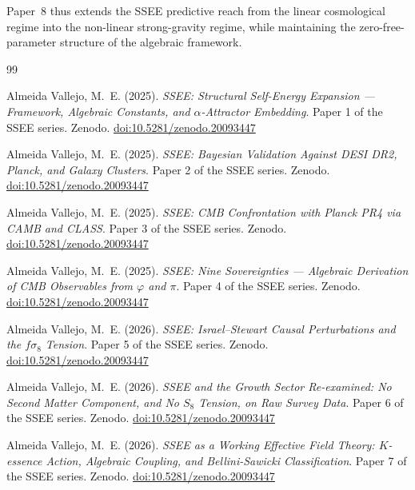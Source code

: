 \documentclass[12pt,a4paper]{article}
\begin{document}
Paper~8 thus extends the SSEE predictive reach from the linear cosmological
regime into the non-linear strong-gravity regime, while maintaining the
zero-free-parameter structure of the algebraic framework.

\clearpage
\begin{thebibliography}{99}

  Almeida Vallejo, M.~E. (2025).
  \textit{SSEE: Structural Self-Energy Expansion --- Framework,
  Algebraic Constants, and $\alpha$-Attractor Embedding}.
  Paper 1 of the SSEE series. Zenodo. \href{https://doi.org/10.5281/zenodo.20093447}{doi:10.5281/zenodo.20093447}

  Almeida Vallejo, M.~E. (2025).
  \textit{SSEE: Bayesian Validation Against DESI DR2, Planck, and
  Galaxy Clusters}.
  Paper 2 of the SSEE series. Zenodo. \href{https://doi.org/10.5281/zenodo.20093447}{doi:10.5281/zenodo.20093447}

  Almeida Vallejo, M.~E. (2025).
  \textit{SSEE: CMB Confrontation with Planck PR4 via CAMB and CLASS}.
  Paper 3 of the SSEE series. Zenodo. \href{https://doi.org/10.5281/zenodo.20093447}{doi:10.5281/zenodo.20093447}

  Almeida Vallejo, M.~E. (2025).
  \textit{SSEE: Nine Sovereignties --- Algebraic Derivation of CMB
  Observables from $\varphi$ and $\pi$}.
  Paper 4 of the SSEE series. Zenodo. \href{https://doi.org/10.5281/zenodo.20093447}{doi:10.5281/zenodo.20093447}

  Almeida Vallejo, M.~E. (2026).
  \textit{SSEE: Israel--Stewart Causal Perturbations and the
  $f\sigma_8$ Tension}.
  Paper 5 of the SSEE series. Zenodo. \href{https://doi.org/10.5281/zenodo.20093447}{doi:10.5281/zenodo.20093447}

  Almeida Vallejo, M.~E. (2026).
  \textit{SSEE and the Growth Sector Re-examined: No Second Matter
  Component, and No $S_8$ Tension, on Raw Survey Data}.
  Paper 6 of the SSEE series. Zenodo. \href{https://doi.org/10.5281/zenodo.20093447}{doi:10.5281/zenodo.20093447}

  Almeida Vallejo, M.~E. (2026).
  \textit{SSEE as a Working Effective Field Theory: $K$-essence Action,
  Algebraic Coupling, and Bellini-Sawicki Classification}.
  Paper 7 of the SSEE series. Zenodo. \href{https://doi.org/10.5281/zenodo.20093447}{doi:10.5281/zenodo.20093447}


\end{thebibliography}
\end{document}
